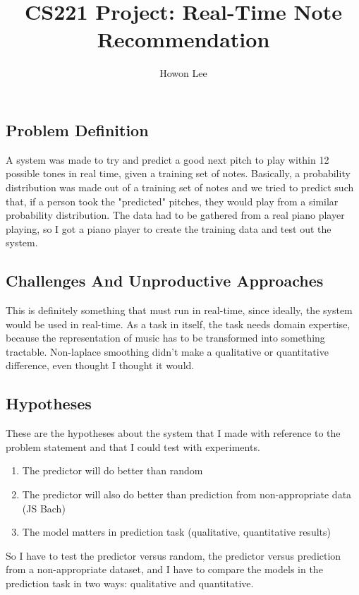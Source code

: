 \documentclass{article}
\begin{document}
\title{CS221 Project: Real-Time Note Recommendation}
\author{Howon Lee}
\maketitle
\subsection*{Problem Definition}
A system was made to try and predict a good next pitch to play within 12 possible tones in real time, given a training set of notes. Basically, a probability distribution was made out of a training set of notes and we tried to predict such that, if a person took the "predicted" pitches, they would play from a similar probability distribution.
The data had to be gathered from a real piano player playing, so I got a piano player to create the training data and test out the system.


\subsection*{Challenges And Unproductive Approaches}
This is definitely something that must run in real-time, since ideally, the system would be used in real-time.
As a task in itself, the task needs domain expertise, because the representation of music has to be transformed into something tractable.
Non-laplace smoothing didn't make a qualitative or quantitative difference, even thought I thought it would.

\subsection*{Hypotheses}
These are the hypotheses about the system that I made with reference to the problem statement and that I could test with experiments.
\begin{enumerate}
    \item The predictor will do better than random
    \item The predictor will also do better than prediction from non-appropriate data (JS Bach)
    \item The model matters in prediction task (qualitative, quantitative results)
\end{enumerate}
So I have to test the predictor versus random, the predictor versus prediction from a non-appropriate dataset, and I have to compare the models in the prediction task in two ways: qualitative and quantitative.
\end{document}
